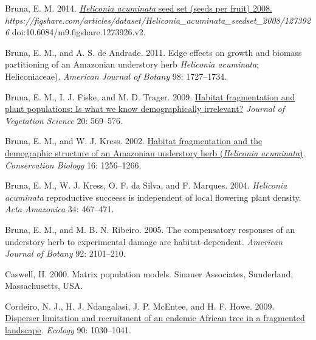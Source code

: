 \documentclass[
  12pt,
  man, donotrepeattitle]{apa6}
\newlength{\cslhangindent}
\newlength{\cslentryspacingunit} %
\newenvironment{CSLReferences}[2] %
 {%
  \setlength{\parindent}{0pt}
  \ifodd #1
  \let\oldpar\par
  \def\par{\hangindent=\cslhangindent\oldpar}
  \fi
  \setlength{\parskip}{#2\cslentryspacingunit}
 }%
 {}
\begin{document}
\begin{CSLReferences}{1}{0}
\leavevmode{}%
Bruna, E. M. 2014. \href{https://doi.org/10.6084/m9.figshare.1273926.v2}{\emph{{Heliconia} acuminata} seed set (seeds per fruit) 2008.} \emph{https://figshare.com/articles/dataset/Heliconia\_acuminata\_seedset\_2008/1273926} doi:10.6084/m9.figshare.1273926.v2.

\leavevmode{}%
Bruna, E. M., and A. S. de Andrade. 2011. Edge effects on growth and biomass partitioning of an {Amazonian} understory herb \emph{{Heliconia} acuminata}; {Heliconiaceae}). \emph{American Journal of Botany} 98: 1727--1734.

\leavevmode{}%
Bruna, E. M., I. J. Fiske, and M. D. Trager. 2009. \href{https://doi.org/10.1111/j.1654-1103.2009.01060.x}{Habitat fragmentation and plant populations: Is what we know demographically irrelevant?} \emph{Journal of Vegetation Science} 20: 569--576.

\leavevmode{}%
Bruna, E. M., and W. J. Kress. 2002. \href{https://doi.org/10.1046/j.1523-1739.2002.99494.x}{Habitat fragmentation and the demographic structure of an {Amazonian} understory herb (\emph{{Heliconia} acuminata})}. \emph{Conservation Biology} 16: 1256--1266.

\leavevmode{}%
Bruna, E. M., W. J. Kress, O. F. da Silva, and F. Marques. 2004. \emph{{Heliconia} acuminata} reproductive succeess is independent of local flowering plant density. \emph{Acta Amazonica} 34: 467--471.

\leavevmode{}%
Bruna, E. M., and M. B. N. Ribeiro. 2005. The compensatory responses of an understory herb to experimental damage are habitat-dependent. \emph{American Journal of Botany} 92: 2101--210.

\leavevmode{}%
Caswell, H. 2000. Matrix population models. Sinauer Associates, Sunderland, Massachusetts, USA.

\leavevmode{}%
Cordeiro, N. J., H. J. Ndangalasi, J. P. McEntee, and H. F. Howe. 2009. \href{https://doi.org/10.1890/07-1208.1}{Disperser limitation and recruitment of an endemic {African} tree in a fragmented landscape}. \emph{Ecology} 90: 1030--1041.


\end{CSLReferences}
\end{document}
